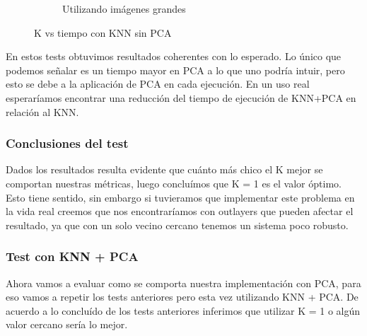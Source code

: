 \begin{figure}[H]
\begin{subfigure}[h]{0.62\linewidth}
\caption{Utilizando imágenes grandes}
\end{subfigure}%
\caption{K vs tiempo con KNN sin PCA}
\end{figure}


En estos tests obtuvimos resultados coherentes con lo esperado.
Lo único que podemos señalar es un tiempo mayor en PCA a lo que uno podría intuir, pero esto se debe a la aplicación de PCA en cada ejecución. En un uso real esperaríamos encontrar una reducción del tiempo de ejecución de KNN+PCA en relación al KNN.




\subsubsection*{Conclusiones del test}
Dados los resultados resulta evidente que cuánto más chico el K mejor se comportan nuestras métricas, luego concluímos que K = 1 es el valor óptimo.
Esto tiene sentido, sin embargo si tuvieramos que implementar este problema en la vida real creemos que nos encontraríamos con outlayers que pueden afectar el resultado, ya que con un solo vecino cercano tenemos un sistema poco robusto.






\subsubsection*{Test con KNN + PCA}
Ahora vamos a evaluar como se comporta nuestra implementación con PCA, para eso vamos a repetir los tests anteriores pero esta vez utilizando KNN + PCA.
De acuerdo a lo concluído de los tests anteriores inferimos que utilizar K = 1 o algún valor cercano sería lo mejor. 



